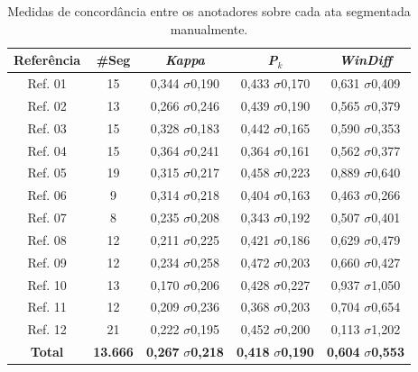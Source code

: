 









\begin{table}[!h]
	\centering
 \begin{tabular}{|c|c|c|c|c|}

\hline
\textbf{Referência}  & \textbf{\#Seg} & \textbf{\textit{Kappa}}       & \textbf{\textit{P}$_k$}                &  \textbf{\textit{WinDiff}}\\ \hline
Ref. 01     & 15    & 0,344  $\sigma$0,190 & 0,433  $\sigma$0,170 & 0,631  $\sigma$0,409 \\ \hline
Ref. 02     & 13    & 0,266  $\sigma$0,246 & 0,439  $\sigma$0,190 & 0,565  $\sigma$0,379 \\ \hline
Ref. 03     & 15    & 0,328  $\sigma$0,183 & 0,442  $\sigma$0,165 & 0,590  $\sigma$0,353 \\ \hline
Ref. 04     & 15    & 0,364  $\sigma$0,241 & 0,364  $\sigma$0,161 & 0,562  $\sigma$0,377 \\ \hline
Ref. 05     & 19    & 0,315  $\sigma$0,217 & 0,458  $\sigma$0,223 & 0,889  $\sigma$0,640 \\ \hline
Ref. 06     & 9     & 0,314  $\sigma$0,218 & 0,404  $\sigma$0,163 & 0,463  $\sigma$0,266 \\ \hline
Ref. 07     & 8     & 0,235  $\sigma$0,208 & 0,343  $\sigma$0,192 & 0,507  $\sigma$0,401 \\ \hline
Ref. 08     & 12    & 0,211  $\sigma$0,225 & 0,421  $\sigma$0,186 & 0,629  $\sigma$0,479 \\ \hline
Ref. 09     & 12    & 0,234  $\sigma$0,258 & 0,472  $\sigma$0,203 & 0,660  $\sigma$0,427 \\ \hline
Ref. 10     & 13    & 0,170  $\sigma$0,206 & 0,428  $\sigma$0,227 & 0,937  $\sigma$1,050 \\ \hline
Ref. 11     & 12    & 0,209  $\sigma$0,236 & 0,368  $\sigma$0,203 & 0,704  $\sigma$0,654 \\ \hline
Ref. 12     & 21    & 0,222  $\sigma$0,195 & 0,452  $\sigma$0,200 & 0,113  $\sigma$1,202 \\ \hline
\textbf{Total}      & \textbf{13.666} & \textbf{0,267}  \textbf{$\sigma$0,218} & \textbf{0,418}  \textbf{$\sigma$0,190} & \textbf{0,604}  \textbf{$\sigma$0,553} \\ \hline
\end{tabular}
\caption{Medidas de concordância entre os anotadores sobre cada ata segmentada manualmente.}
\label{tab:detalhesSegRef}
\end{table}





